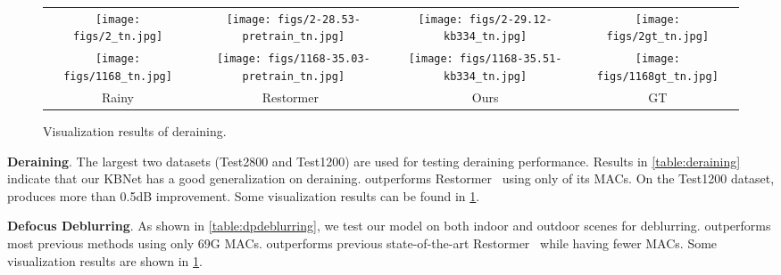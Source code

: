 \documentclass[default,iicol]{sn-jnl}
\theoremstyle{thmstyleone}\newtheorem{theorem}{Theorem}\newtheorem{proposition}[theorem]{Proposition}
\theoremstyle{thmstyletwo}\newtheorem{example}{Example}\newtheorem{remark}{Remark}
\theoremstyle{thmstylethree}\newtheorem{definition}{Definition}
\begin{document}
 \begin{table}[t]
 \caption{The effectiveness of different branches in MFF block.}
    \begin{center}
    \end{center}
    
    \label{table:ab_branch}
\end{table} \setlength{\tabcolsep}{1pt}
\begin{figure}[!t]
    \footnotesize
    \begin{center}
\begin{tabular}{cccc}
        \texttt{[image: figs/2\_tn.jpg]} &
        \texttt{[image: figs/2-28.53-pretrain\_tn.jpg]} &
        \texttt{[image: figs/2-29.12-kb334\_tn.jpg]} &
        \texttt{[image: figs/2gt\_tn.jpg]} \\
\texttt{[image: figs/1168\_tn.jpg]} &
        \texttt{[image: figs/1168-35.03-pretrain\_tn.jpg]} &
        \texttt{[image: figs/1168-35.51-kb334\_tn.jpg]} &
        \texttt{[image: figs/1168gt\_tn.jpg]} \\
        Rainy & Restormer~\cite{restormer} & Ours & GT \\
\end{tabular}
    \end{center}
\caption{Visualization results of deraining.}
    \label{fig:derain}
\end{figure} 
\noindent\textbf{Deraining}. The largest two datasets (Test2800 and Test1200) are used for testing deraining performance. 
Results in \cref{table:deraining} indicate that our KBNet has a good generalization on deraining. 
 outperforms Restormer~\cite{restormer} using only  of its MACs.
On the Test1200 dataset,  produces more than 0.5dB improvement.
Some visualization results can be found in \cref{fig:derain}.

\noindent\textbf{Defocus Deblurring}. As shown in \cref{table:dpdeblurring}, we test our model on both indoor and outdoor scenes for deblurring. 
 outperforms most previous methods using only 69G MACs.
 outperforms previous state-of-the-art Restormer~\cite{restormer}  while having  fewer MACs.
Some visualization results are shown in \cref{fig:derain}.
\end{document}
